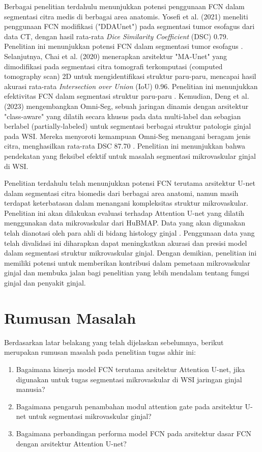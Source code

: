 \noindent Berbagai penelitian terdahulu menunjukkan potensi penggunaan FCN dalam segmentasi citra medis di berbagai area anatomis. Yosefi et al. (2021) meneliti penggunaan FCN modifikasi ("DDAUnet") pada segmentasi tumor esofagus dari data CT, dengan hasil rata-rata \textit{Dice Similarity Coefficient} (DSC) 0.79. Penelitian ini menunjukkan potensi FCN dalam segmentasi tumor esofagus \cite{yousefi_esophageal_2021}. Selanjutnya, Chai et al. (2020) menerapkan arsitektur "MA-Unet" yang dimodifikasi pada segmentasi citra tomografi terkomputasi (computed tomography scan) 2D untuk mengidentifikasi struktur paru-paru, mencapai hasil akurasi rata-rata \textit{Intersection over Union} (IoU) 0.96. Penelitian ini menunjukkan efektivitas FCN dalam segmentasi struktur paru-paru \cite{cai_ma-unet_2020}. Kemudian, Deng et al. (2023) mengembangkan Omni-Seg, sebuah jaringan dinamis dengan arsitektur "class-aware" yang dilatih secara khusus pada data multi-label dan sebagian berlabel (partially-labeled) untuk segmentasi berbagai struktur patologis ginjal pada WSI. Mereka menyoroti kemampuan Omni-Seg menangani beragam jenis citra, menghasilkan rata-rata DSC 87.70 \cite{deng_omni-seg_2022}. Penelitian ini menunjukkan bahwa pendekatan yang fleksibel efektif untuk masalah segmentasi mikrovaskular ginjal di WSI.

\noindent Penelitian terdahulu telah menunjukkan potensi FCN terutama arsitektur U-net dalam segmentasi citra biomedis dari berbagai area anatomi, namun masih terdapat keterbatasan dalam menangani kompleksitas struktur mikrovaskular. Penelitian ini akan dilakukan evaluasi terhadap Attention U-net yang dilatih menggunakan data mikrovaskular dari HuBMAP. Data yang akan digunakan telah dianotasi oleh para ahli di bidang histology ginjal \cite{howard_hubmap_2023}. Penggunaan data yang telah divalidasi ini diharapkan dapat meningkatkan akurasi dan presisi model dalam segmentasi struktur mikrovaskular ginjal. Dengan demikian, penelitian ini memiliki potensi untuk memberikan kontribusi dalam pemetaan mikrovaskular ginjal dan membuka jalan bagi penelitian yang lebih mendalam tentang fungsi ginjal dan penyakit ginjal. 

\section{Rumusan Masalah}
\noindent Berdasarkan latar belakang yang telah dijelaskan sebelumnya, berikut merupakan rumusan masalah pada penelitian tugas akhir ini:
\begin{enumerate}
    \item Bagaimana kinerja model FCN terutama arsitektur Attention U-net, jika digunakan untuk tugas segmentasi mikrovaskular di WSI jaringan ginjal manusia?
    \item Bagaimana pengaruh penambahan modul attention gate pada arsitektur U-net untuk segmentasi mikrovaskular ginjal?
    \item Bagaimana perbandingan performa model FCN pada arsitektur dasar FCN dengan arsitektur Attention U-net?
\end{enumerate}


